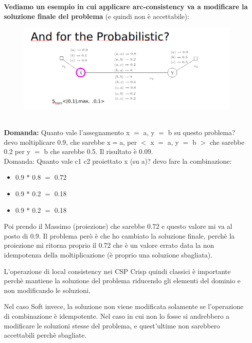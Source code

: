 \noindent \textbf{Vediamo un esempio in cui applicare arc-consistency va a modificare la soluzione finale del problema} (e quindi non è accettabile):
\begin{figure}[htp]
	\centering
    \includegraphics[width=14cm, keepaspectratio]{img/Cap5/probabilistc2.png}
\end{figure}
\\
\textbf{Domanda:} Quanto vale l’assegnamento x $=$ a, y $=$ b su questo problema? 
\\devo moltiplicare 0.9, che sarebbe x$=$a, per $<$ x $=$ a, y $=$ b $>$ che sarebbe 0.2 per y $=$ b che sarebbe 0.5. Il risultato è 0.09.
\\Domanda: Quanto vale c1 c2 proiettato x (su a)? devo fare la combinazione:
\begin{itemize}
    \item 0.9 $*$ 0.8 $=$ 0.72
    \item 0.9 $*$ 0.2 $=$ 0.18
    \item 0.9 $*$ 0.2 $=$ 0.18
\end{itemize}
Poi prendo il Massimo (proiezione) che sarebbe 0.72 e questo valore mi va al posto di 0.9. Il problema però è che ho cambiato la soluzione finale, perchè la proiezione mi ritorna proprio il 0.72 che è un valore errato data la non idempotenza della moltiplicazione (è proprio una soluzione sbagliata).

\vspace{0.8cm}

\noindent L’operazione di local consistency nei CSP Crisp quindi classici è importante perchè mantiene la soluzione del problema riducendo gli elementi del dominio e non modificando le soluzioni.

\vspace{0.5cm}

\noindent Nel caso Soft invece, la soluzione non viene modificata solamente se l’operazione di combinazione è idempotente. Nel caso in cui non lo fosse si andrebbero a modificare le soluzioni stesse del problema, e quest’ultime non sarebbero accettabili perchè sbagliate.

